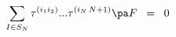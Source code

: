 \begin{equation}
\sum_{I \in S_N}
\tau^{( i_1 i_2 )} ... \tau^{( i_N \, N+1)} \pa  F \;\; =\;\; 0
\label{eq:4.24}
\end{equation}

